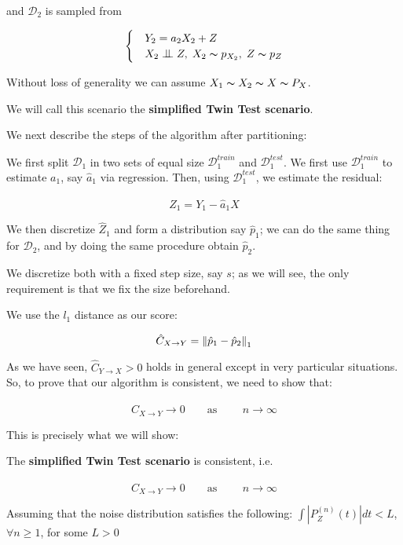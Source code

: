 and $\mathcal{D}_2$ is sampled from 

\[ \begin{cases} 
    & Y_2 = a_2 X_2 + Z  \\
    & X_2 \bigCI Z,\; X_2 \thicksim p_{X_2},\; Z \thicksim p_{Z}  
 \end{cases}
\]

Without loss of generality we can assume $X_1 \thicksim X_2 \thicksim X \thicksim P_X$.

We will call this scenario the \textbf{simplified Twin Test scenario}. 

We next describe the steps of the algorithm after partitioning:

We first split $\mathcal{D}_1$ in two sets of equal size $\mathcal{D}_{1}^{train}$ and 
$\mathcal{D}_{1}^{test}$. We first use $\mathcal{D}_{1}^{train}$ to estimate $a_1$, say $\hat{a}_1$ via 
regression. Then, using $\mathcal{D}_{1}^{test}$, we estimate the residual:

$$
    \hat{Z}_1 = Y_1 - \hat{a}_1 X
$$

We then discretize $\hat{Z}_1$ and form a distribution say $\hat{p}_1$; we can do the same thing for 
$\mathcal{D}_2$, and by doing the same procedure obtain $\hat{p}_2$.

We discretize both with a fixed step size, say $s$; as we will see, the only requirement is that we fix 
the size beforehand.

We use the $l_1$ distance as our score:

$$
    \hat{C}_{X \rightarrow Y} = \left\lVert\hat{p}_1 - \hat{p}_2\right\rVert_1
$$

As we have seen, $\hat{C}_{Y \rightarrow X} > 0$ holds in general except in very particular situations. So, 
to prove that our algorithm is consistent, we need to show that:

$$
    \hat{C}_{X \rightarrow Y} \rightarrow 0 \qquad \text{as }  \qquad n \rightarrow \infty
$$

This is precisely what we will show:

\begin{theorem}
    The \textbf{simplified Twin Test scenario} is consistent, i.e. 

$$
    \hat{C}_{X \rightarrow Y} \rightarrow 0 \qquad \text{as }  \qquad n \rightarrow \infty
$$

Assuming that the noise distribution satisfies the following: 
$\int \left| P_{Z}^{(n)}(t) \right| d t < L$, $\forall n\geq 1$, for some $L > 0$
\end{theorem}

